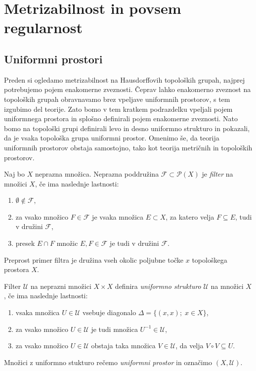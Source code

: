 \documentclass[mat1]{fmfdelo}
\newcommand{\Ucurl}{\mathcal{U}}
\begin{document}
\section{Metrizabilnost in povsem regularnost}
\subsection{Uniformni prostori}
Preden si ogledamo metrizabilnost na Hausdorffovih topoloških grupah, najprej potrebujemo pojem enakomerne zveznosti. Čeprav lahko enakomerno zveznost na topoloških grupah obravnavamo brez vpeljave uniformnih prostorov, s tem izgubimo del teorije. Zato bomo v tem kratkem podrazdelku vpeljali pojem uniformnega prostora in splošno definirali pojem enakomerne zveznosti. Nato bomo na topološki grupi definirali levo in desno uniformno strukturo in pokazali, da je vsaka topološka grupa uniformni prostor. Omenimo še, da teorija uniformnih prostorov obstaja samostojno, tako kot teorija metričnih in topoloških prostorov.
\begin{definicija}\label{def:uniform}
Naj bo $X$ neprazna množica. Neprazna poddružina $\mathcal{F} \subset \mathcal{P}(X)$ je \emph{filter} na množici $X$, če ima naslednje lastnosti:
\begin{enumerate}
\item $\emptyset \notin \mathcal{F}$,
\item za vsako množico $F \in \mathcal{F}$ je vsaka množica $E \subset X$, za katero velja $F \subseteq E$, tudi v družini $\mathcal{F}$,
\item presek $E \cap F$ množic $E, F \in \mathcal{F}$ je tudi v družini $\mathcal{F}$.
\end{enumerate}
\end{definicija}

\begin{primer}
Preprost primer filtra je družina vseh okolic poljubne točke $x$ topološkega prostora $X$. 
\end{primer}
\begin{definicija}
Filter $\mathcal{U}$ na neprazni množici $X \times X$ definira \emph{uniformno strukturo} $\Ucurl$ na množici $X$, če ima naslednje lastnosti:
\begin{enumerate}
\item vsaka množica $U \in \mathcal{U}$ vsebuje diagonalo $\Delta = \lbrace (x, x) ;\; x \in X \rbrace$,
\item za vsako množico $U \in \mathcal{U}$ je tudi množica $U^{-1} \in \mathcal{U}$,
\item za vsako množico $U \in \mathcal{U}$ obstaja taka množica $V \in \mathcal{U}$, da velja $V \circ V \subseteq U$.
\end{enumerate}
Množici z uniformno stukturo rečemo \emph{uniformni prostor} in označimo $(X, \Ucurl)$.
\end{definicija}
\end{document}
